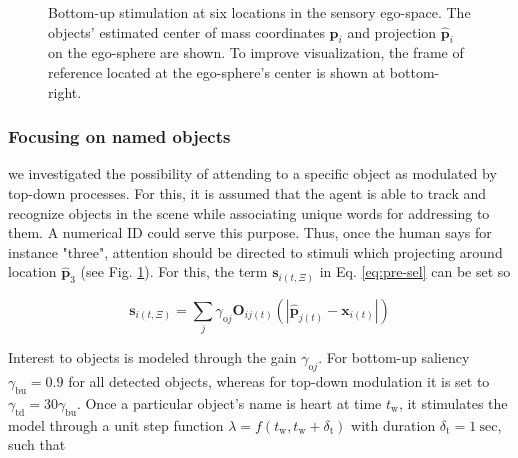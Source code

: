 \documentclass[letterpaper, 10 pt, conference]{ieeeconf}  %
\begin{document}
\begin{figure}[h!]
\begin{center}
			\caption{Bottom-up stimulation at six locations in the sensory ego-space. The objects' estimated center of mass coordinates $\mathbf{p}_i$ and projection $\mathbf{\hat{p}}_i$ on the ego-sphere are shown. To improve visualization, the frame of reference located at the ego-sphere's center is shown at bottom-right.}
			\label{fig:sim_objs}
			\end{center}
		\end{figure}
				
	\subsubsection{Focusing on named objects}
	
	we investigated the possibility of attending to a specific object as modulated by top-down processes. For this, it is assumed that the agent is able to track and recognize objects in the scene while associating unique words for addressing to them. A numerical ID could serve this purpose. Thus, once the human says for instance "three", attention should be directed to stimuli which projecting around location $\mathbf{\hat{p}}_3$ (see Fig. \ref{fig:sim_objs}). For this, the term $\mathbf{s}_{i(t,\Xi)}$ in Eq. \eqref{eq:pre-sel} can be set so
	
	\begin{equation}
	\mathbf{s}_{i(t,\Xi)} = \sum_{j}^{} \gamma_{\mathrm{o}j}\mathbf{O}_{ij(t)}\left(|\mathbf{\hat{p}}_{j(t)} - \mathbf{x}_{i(t)}|\right)
	\label{eq:sim1}
	\end{equation}
	
	Interest to objects is modeled through the gain $\gamma_{\mathrm{o}j}$. For bottom-up saliency  $\gamma_\mathrm{bu} = 0.9$ for all detected objects, whereas for top-down modulation it is set to $\gamma_\mathrm{td} = 30\gamma_\mathrm{bu}$. Once a particular object's name is heart at time $t_\mathrm{w}$, it stimulates the model through a unit step function $\lambda = f(t_\mathrm{w}, t_\mathrm{w}+\delta_\mathrm{t})$ with duration $\delta_\mathrm{t} = 1\ \mathrm{sec}$, such that
	
\end{document}
